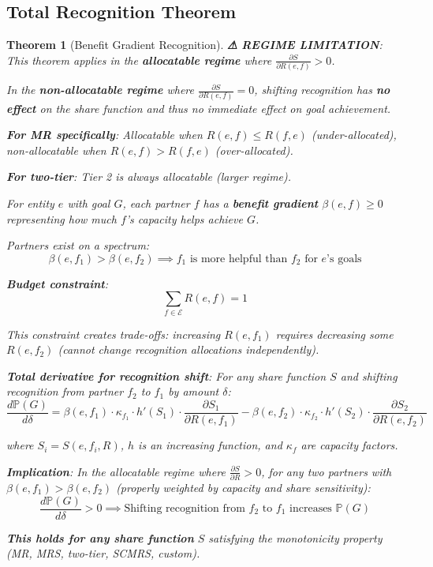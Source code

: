 \documentclass[11pt,a4paper]{article}
\newtheorem{theorem}{Theorem}[section]
\theoremstyle{definition}
\theoremstyle{remark}
\newcommand{\E}{\mathcal{E}}
\begin{document}
\subsection{Total Recognition Theorem}

\begin{theorem}[Benefit Gradient Recognition]
\textbf{\color{red} ⚠ REGIME LIMITATION}: This theorem applies in the \textbf{allocatable regime} where $\frac{\partial S}{\partial R(e,f)} > 0$.

In the \textbf{non-allocatable regime} where $\frac{\partial S}{\partial R(e,f)} = 0$, shifting recognition has \textbf{no effect} on the share function and thus no immediate effect on goal achievement.

\textbf{For MR specifically}: Allocatable when $R(e,f) \le R(f,e)$ (under-allocated), non-allocatable when $R(e,f) > R(f,e)$ (over-allocated).

\textbf{For two-tier}: Tier 2 is always allocatable (larger regime).

\medskip

For entity $e$ with goal $G$, each partner $f$ has a \textbf{benefit gradient} $\beta(e,f) \ge 0$ representing how much $f$'s capacity helps achieve $G$.

Partners exist on a spectrum:
\[ \beta(e,f_1) > \beta(e,f_2) \implies f_1 \text{ is more helpful than } f_2 \text{ for } e\text{'s goals} \]

\textbf{Budget constraint}:
\[ \sum_{f \in \E} R(e,f) = 1 \]

This constraint creates trade-offs: increasing $R(e,f_1)$ requires decreasing some $R(e,f_2)$ (cannot change recognition allocations independently).

\textbf{Total derivative for recognition shift}: For any share function $S$ and shifting recognition from partner $f_2$ to $f_1$ by amount $\delta$:
\[ \frac{d\mathbb{P}(G)}{d\delta} = \beta(e,f_1) \cdot \kappa_{f_1} \cdot h'(S_1) \cdot \frac{\partial S_1}{\partial R(e,f_1)} - \beta(e,f_2) \cdot \kappa_{f_2} \cdot h'(S_2) \cdot \frac{\partial S_2}{\partial R(e,f_2)} \]

where $S_i = S(e,f_i,R)$, $h$ is an increasing function, and $\kappa_f$ are capacity factors.

\textbf{Implication}: In the allocatable regime where $\frac{\partial S}{\partial R} > 0$, for any two partners with $\beta(e,f_1) > \beta(e,f_2)$ (properly weighted by capacity and share sensitivity):
\[ \frac{d\mathbb{P}(G)}{d\delta} > 0 \implies \text{Shifting recognition from } f_2 \text{ to } f_1 \text{ increases } \mathbb{P}(G) \]

\textbf{This holds for any share function} $S$ satisfying the monotonicity property (MR, MRS, two-tier, SCMRS, custom).
\end{theorem}
\end{document}
